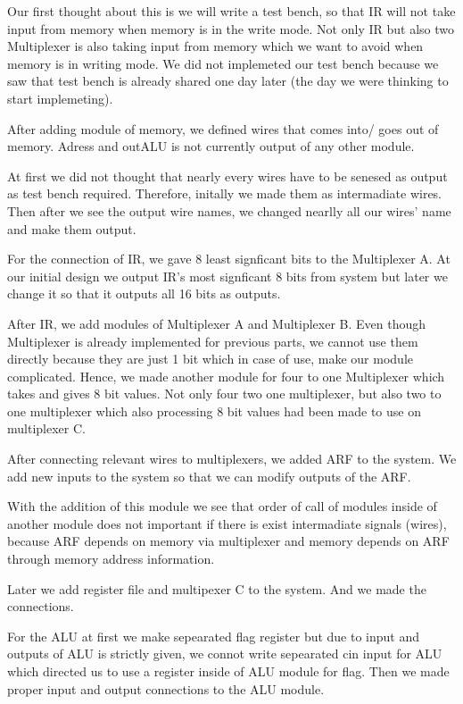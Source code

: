 \documentclass[pdftex,12pt,a4paper]{article}
\begin{document}
 Our first thought about this is we will write a test bench, so that IR will not
  take input from memory when memory is in the write mode. Not only IR but also 
  two Multiplexer is also taking input from memory which we want to avoid when 
  memory is in writing mode. We did not implemeted our test bench because we saw
   that test bench is already shared one day later (the day we were thinking to 
   start implemeting).

   After adding module of memory, we defined wires that comes into/ goes out of 
   memory. Adress and outALU is not currently output of any other module. 

   At first we did not thought that nearly every wires have to be senesed as 
   output as test bench required. Therefore, initally we made them as intermadiate 
   wires. Then after we see the output wire names, we changed nearlly all our wires' 
   name and make them output.

	For the connection of IR, we gave 8 least signficant bits to the Multiplexer A.
	At our initial design we output IR's most signficant 8 bits from system but later we change
	 it so that it outputs all 16 bits as outputs.

	After IR, we add modules of Multiplexer A and Multiplexer B. Even though 
	Multiplexer is already implemented for previous parts, we cannot use them 
	directly because they are just 1 bit which in case of use, make our module
	complicated. Hence, we made another module for four to one Multiplexer which 
	takes and gives 8 bit values. Not only four two one multiplexer, but also two
	to one multiplexer which also processing 8 bit values had been made to use on 
	multiplexer C. 

	After connecting relevant wires to multiplexers, we added ARF to the system.
	We add new inputs to the system so that we can modify outputs of the ARF.

	With the addition of this module we see that order of call of modules inside of another 
	module does not important if there is exist intermadiate signals (wires), because
	ARF depends on memory via multiplexer and memory depends on ARF through memory
	 address information.

	 Later we add register file and multipexer C to the system. And we made the connections.

	For the ALU at first we make sepearated flag register but due to input and outputs of ALU 
	is strictly given, we connot write sepearated cin input for ALU which directed us to use a register
	inside of ALU module for flag. Then we made proper input and output connections to the ALU
	module.
\end{document}
